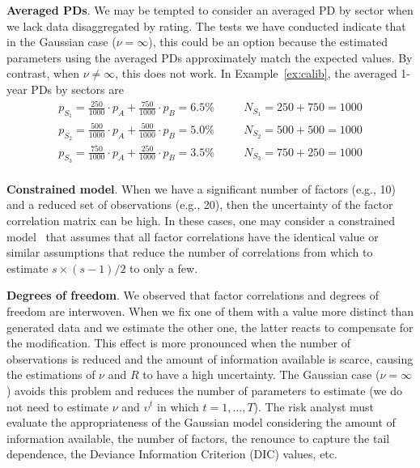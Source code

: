 \documentclass[11pt,fleqn]{book} %
\begin{document}
\textbf{Averaged PDs}. We may be tempted to consider an averaged PD by sector 
when we lack data disaggregated by rating. The tests we have conducted 
indicate that in the Gaussian case ($\nu = \infty$), this could be an option 
because the estimated parameters using the averaged PDs approximately match 
the expected values. By contrast, when $\nu \ne \infty$, this does not work. 
In Example~\ref{ex:calib}, the averaged 1-year PDs by sectors are
\begin{displaymath}
	\begin{array}{lll}
		p_{S_1} = \frac{250}{1000} \cdot p_A + \frac{750}{1000} \cdot p_B = 6.5\% & \quad & N_{S_1} = 250 + 750 = 1000 \\
		p_{S_2} = \frac{500}{1000} \cdot p_A + \frac{500}{1000} \cdot p_B = 5.0\% & \quad & N_{S_2} = 500 + 500 = 1000 \\
		p_{S_3} = \frac{750}{1000} \cdot p_A + \frac{250}{1000} \cdot p_B = 3.5\% & \quad & N_{S_3} = 750 + 250 = 1000 \\
	\end{array}
\end{displaymath}

\textbf{Constrained model}. When we have a significant number of factors 
(e.g., 10) and a reduced set of observations (e.g., 20), then the uncertainty 
of the factor correlation matrix can be high. In these cases, one may consider 
a constrained model~\cite{roncalli:2004} that assumes that all factor 
correlations have the identical value or similar assumptions that reduce the 
number of correlations from which to estimate $s{\times}(s-1)/2$ to only a 
few.

\textbf{Degrees of freedom}. We observed that factor correlations and degrees 
of freedom are interwoven. When we fix one of them with a value more distinct 
than generated data and we estimate the other one, the latter reacts to 
compensate for the modification. This effect is more pronounced when the 
number of observations is reduced and the amount of 
information available is scarce, causing the estimations of $\nu$ and $R$
to have a high uncertainty. The Gaussian case ($\nu = \infty$) avoids this 
problem and reduces the number of parameters to estimate (we do not need to 
estimate $\nu$ and $\upsilon^t$ in which $t=1,\dots,T$). 
The risk analyst must evaluate the appropriateness of the Gaussian model 
considering the amount of information available, the number of factors, 
the renounce to capture the tail dependence, the Deviance Information 
Criterion (DIC) values, etc.
\end{document}
